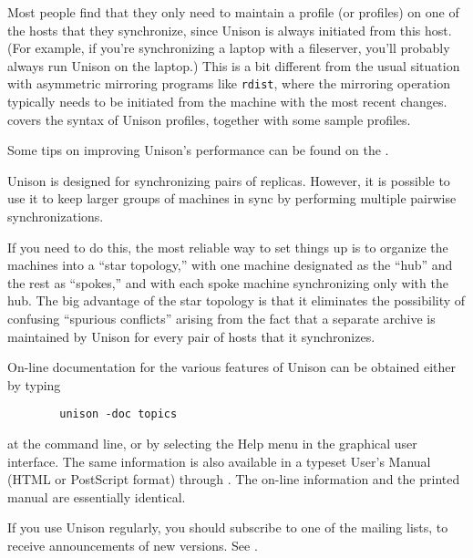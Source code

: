 \documentclass{article}
\begin{document}
Most people find that they only need to maintain a profile (or
profiles) on one of the hosts that they synchronize, since Unison is
always initiated from this host.  (For example, if you're
synchronizing a laptop with a fileserver, you'll probably always run
Unison on the laptop.)  This is a bit different from the usual
situation with asymmetric mirroring programs like \verb|rdist|, where
the mirroring operation typically needs to be initiated from the
machine with the most recent changes.  
covers the syntax of Unison profiles, together with some sample profiles.

Some tips on improving Unison's performance can be found on the
.


Unison is designed for synchronizing pairs of replicas.  However, it is
possible to use it to keep larger groups of machines in sync by performing
multiple pairwise synchronizations.  

If you need to do this, the most reliable way to set things up is to
organize the machines into a ``star topology,'' with one machine designated
as the ``hub'' and the rest as ``spokes,'' and with each spoke machine
synchronizing only with the hub.  The big advantage of the star topology is
that it eliminates the possibility of confusing ``spurious conflicts''
arising from the fact that a separate archive is maintained by Unison for
every pair of hosts that it synchronizes.



On-line documentation for the various features of Unison
can be obtained either by typing
\begin{verbatim}
        unison -doc topics
\end{verbatim}
\noindent
at the command line, or by selecting the Help menu in the graphical
user interface.  
\iftextversion
The same information is also available in a typeset User's
Manual (HTML or PostScript format) through
. 
\else
The on-line information and the printed manual are essentially identical.
\fi

If you use Unison regularly, you should subscribe to one of the mailing
lists, to receive announcements of new versions.  See
. 
\end{document}
